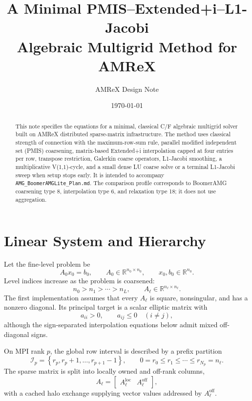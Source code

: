 \documentclass[11pt]{article}
\title{A Minimal PMIS--Extended+i--L1-Jacobi\\
       Algebraic Multigrid Method for AMReX}
\author{AMReX Design Note}
\date{\today}
\newcommand{\R}{\mathbb{R}}
\newcommand{\set}[1]{\left\{ #1 \right\}}
\newcommand{\level}{\ell}
\begin{document}
\maketitle

\begin{abstract}
This note specifies the equations for a minimal, classical C/F algebraic
multigrid solver built on AMReX distributed sparse-matrix infrastructure.  The
method uses classical strength of connection with the maximum-row-sum rule,
parallel modified independent set (PMIS) coarsening, matrix-based Extended+i
interpolation capped at four entries per row, transpose restriction, Galerkin
coarse operators, L1-Jacobi smoothing, a multiplicative V(1,1)-cycle, and a
small dense LU coarse solve or a terminal L1-Jacobi sweep when setup stops
early.  It is intended to accompany
\texttt{AMG\_BoomerAMGLite\_Plan.md}.  The comparison profile corresponds to
BoomerAMG coarsening type 8, interpolation type 6, and relaxation type 18; it
does not use aggregation.
\end{abstract}

\tableofcontents

\section{Linear System and Hierarchy}

Let the fine-level problem be
\begin{equation}
  A_0 x_0 = b_0,
  \qquad
  A_0 \in \R^{n_0\times n_0},
  \qquad
  x_0,b_0\in\R^{n_0}.
  \label{eq:fine-system}
\end{equation}
Level indices increase as the problem is coarsened:
\begin{equation}
  n_0 > n_1 > \cdots > n_L,
  \qquad
  A_\level\in\R^{n_\level\times n_\level}.
  \label{eq:level-sizes}
\end{equation}
The first implementation assumes that every $A_\level$ is square, nonsingular,
and has a nonzero diagonal.  Its principal target is a scalar elliptic matrix
with
\begin{equation}
  a_{ii}>0,
  \qquad
  a_{ij}\leq 0 \quad (i\neq j),
  \label{eq:m-matrix-sign}
\end{equation}
although the sign-separated interpolation equations below admit mixed
off-diagonal signs.

On MPI rank $p$, the global row interval is described by a prefix partition
\begin{equation}
  \mathcal I_p =
  \set{r_p,r_p+1,\ldots,r_{p+1}-1},
  \qquad
  0=r_0\leq r_1\leq\cdots\leq r_{N_p}=n_\level.
  \label{eq:row-partition}
\end{equation}
The sparse matrix is split into locally owned and off-rank columns,
\begin{equation}
  A_\level =
  \begin{bmatrix}
    A_\level^{\mathrm{loc}} &
    A_\level^{\mathrm{off}}
  \end{bmatrix},
  \label{eq:parcsr-split}
\end{equation}
with a cached halo exchange supplying vector values addressed by
$A_\level^{\mathrm{off}}$.
\end{document}
